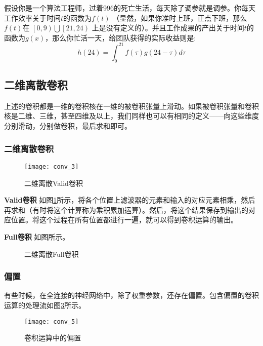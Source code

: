         假设你是一个算法工程师，过着996的死亡生活，每天除了调参就是调参。你每天工作效率关于时间$t$的函数为$f\left(t\right)$ （显然，如果你准时上班，正点下班，那么$f\left(t\right) $在 $\left[0,9\right) \bigcup \left[ 21,24 \right)$ 上是没有定义的）。并且工作成果的产出关于时间$t$的函数为$g\left(x\right)$，那么你忙活一天，给团队获得的实际收益则是: 
        $$ h\left(24\right) = \int_{9}^{21} {f\left(\tau \right) g\left(24-\tau \right)d\tau} $$
    \subsection{二维离散卷积}
        上述的卷积都是一维的卷积核在一维的被卷积张量上滑动。如果被卷积张量和卷积核是二维、三维，甚至四维及以上，我们同样也可以有相同的定义——向这些维度分别滑动，分别做卷积，最后求和即可。
        \subsubsection{二维离散卷积}
        
        \begin{figure}[!htbp]
            \centering
            \texttt{[image: conv\_3]}
            \caption{二维离散Valid卷积}
            \label{fig:3}
        \end{figure}
    
        \textbf{Valid卷积} \quad 如图\ref{fig:3}所示，将各个位置上滤波器的元素和输入的对应元素相乘，然后再求和（有时将这个计算称为乘积累加运算）。然后，将这个结果保存到输出的对应位置。将这个过程在所有位置都进行一遍，就可以得到卷积运算的输出。
        
    
        \textbf{Full卷积} \quad 如图所示。
      
        \begin{figure}
            \centering
            \caption{二维离散Full卷积}
            \label{fig:4}
        \end{figure}
    
        \subsubsection{偏置}
        
        有些时候，在全连接的神经网络中，除了权重参数，还存在偏置。包含偏置的卷积运算的处理流如图\ref{fig:5}所示。
        
        \begin{figure}[!htbp]
            \centering
            \texttt{[image: conv\_5]}
            \caption{卷积运算中的偏置}
            \label{fig:5}
        \end{figure}
    

